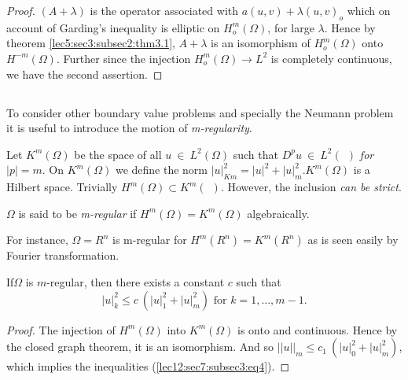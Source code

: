 \begin{proof}%
  $(A + \lambda)$ is the operator associated with $a(u,v) +
  \lambda(u,v)_o$ which on account of Garding's inequality is
   elliptic on $H^m_o(\Omega)$, for large $\lambda$. Hence by theorem
   \ref{lec5:sec3:subsec2:thm3.1}, $A +\lambda$ is an isomorphism of $H^m_o(\Omega)$ onto
   $H^{-m}(\Omega)$. Further since the injection $H^m_o(\Omega)
   \rightarrow L^2$ is completely continuous, we have the second
   assertion. 
\end{proof} 
 
\subsection{}\label{lec12:sec7:subsec3}  %

To consider other boundary value problems and
specially the Neumann problem it is useful to introduce the motion of
\textit{m-regularity}. 

Let $K^m(\Omega)$ be the space of all $u ~ \in ~ L^2(\Omega)$
such that $D^p u ~ \in ~ L^2 (~~) $ \textit{ for $|p| = m$}.
On $K^m(\Omega)$ we define the norm $| u |^2_{K m} = | u |^2 + |u|^2_m
. K^m (\Omega)$ is a Hilbert space. Trivially $H^m(\Omega) \subset
K^m(~~)$. However, the inclusion \textit{can be strict}.  

\begin{definition}\label{lec12:sec7:subsec3:def7.2}%
  $\Omega$ is said to be \textit{m-regular} if $H^m(\Omega) =
  K^m(\Omega)$ algebraically. 
\end{definition}

For instance, $\Omega = R^n$ is m-regular for $H^m(R^n) = K^m(R^n)$ as
is seen easily by Fourier transformation. 

\begin{theorem}\label{lec12:sec7:subsec3:thm7.3}%
  If\pageoriginale $\Omega$ is $m$-regular, then there exists a constant $c$ such that 
  \begin{equation}
    |u|^2_k \leq c ~ (|u|^2_1 + |u|^2_m) \text{ for } k = 1,\ldots, m-1.\tag{4}\label{lec12:sec7:subsec3:eq4} 
  \end{equation} 
\end{theorem}

\begin{proof}%
  The injection of $H^m(\Omega)$ into $K^m(\Omega)$ is onto and
  continuous. Hence by the closed graph theorem, it is an
  isomorphism. And so $|| u ||_m \leq c_1 ~ (|u|^2_0 + |u|^2_m)$, which
  implies the inequalities (\ref{lec12:sec7:subsec3:eq4}). 
\end{proof} 
 
